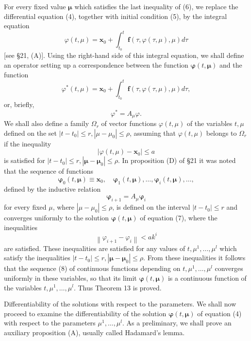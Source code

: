 \documentclass[10pt,a5paper]{book}
\makeatletter
\theoremstyle{plain}
\theoremstyle{definition}
\theoremstyle{remark}
\renewenvironment{proof}[1][\proofname]{\par
  \pushQED{\qed}%
  \normalfont\topsep6\p@\@plus6\p@\relax
  \trivlist
  \item\relax{\itshape #1\@addpunct{.}}\hspace\labelsep\ignorespaces
}{\popQED\endtrivlist\@endpefalse}
\makeatother
\begin{document}
\begin{proof}
For every fixed value $\boldsymbol{\mu}$ which satisfies the last inequality of (6), we replace the differential equation (4), together with initial condition (5), by the integral equation
\begin{equation*}
\varphi(t, \mu)=\mathbf{x}_{0}+\int_{t_{0}}^{t} \mathbf{f}(\tau, \varphi(\tau, \mu), \mu) d \tau \tag{7}
\end{equation*}
[see §21, (A)]. Using the right-hand side of this integral equation, we shall define an operator setting up a correspondence between the function $\boldsymbol{\varphi}(t, \boldsymbol{\mu})$ and the function
\[
\varphi^{*}(t, \mu)=\mathbf{x}_{0}+\int_{t_{0}}^{t} \mathbf{f}(\tau, \varphi(\tau, \mu), \mu) d \tau,
\]
or, briefly,
\[
\varphi^{*}=A_{\mu} \varphi .
\]
We shall also define a family $\Omega_{r}$ of vector functions $\varphi(t, \mu)$ of the variables $t, \mu$ defined on the set $\left|t-t_{0}\right| \leq r,\left|\mu-\mu_{0}\right| \leq \rho$, assuming that $\varphi(t, \mu)$ belongs to $\Omega_{r}$ if the inequality
\[
\left|\varphi(t, \mu)-\mathbf{x}_{0}\right| \leq a
\]
is satisfied for $\left|t-t_{0}\right| \leq r,\left|\boldsymbol{\mu}-\boldsymbol{\mu}_{0}\right| \leq \rho$. In proposition (D) of §21 it was noted that the sequence of functions
\begin{equation*}
\boldsymbol{\varphi}_{0}(t, \boldsymbol{\mu}) \equiv \mathbf{x}_{0}, \quad \boldsymbol{\varphi}_{1}(t, \boldsymbol{\mu}), \ldots, \boldsymbol{\varphi}_{i}(t, \boldsymbol{\mu}), \ldots, \tag{8}
\end{equation*}
defined by the inductive relation
\[
\boldsymbol{\varphi}_{i+1}=A_{\mu} \boldsymbol{\varphi}_{i}
\]
for every fixed $\mu$, where $\left|\mu-\mu_{0}\right| \leq \rho$, is defined on the interval $\left|t-t_{0}\right| \leq r$ and converges uniformly to the solution $\boldsymbol{\varphi}(t, \boldsymbol{\mu})$ of equation (7), where the inequalities
\[
\left\|\varphi_{i+1}-\varphi_{i}\right\|<a k^{i}
\]
are satisfied. These inequalities are satisfied for any values of $t, \mu^{1}, \ldots, \mu^{l}$ which satisfy the inequalities $\left|t-t_{0}\right| \leq r,\left|\boldsymbol{\mu}-\boldsymbol{\mu}_{0}\right| \leq \rho$. From these inequalities it follows that the sequence (8) of continuous functions depending on $t, \mu^{1}, \ldots, \mu^{l}$ converges uniformly in these variables, so that its limit $\boldsymbol{\varphi}(t, \boldsymbol{\mu})$ is a continuous function of the variables $t, \mu^{1}, \ldots, \mu^{l}$. Thus Theorem 13 is proved.

Differentiability of the solutions with respect to the parameters. We shall now proceed to examine the differentiability of the solution $\boldsymbol{\varphi}(t, \boldsymbol{\mu})$ of equation (4) with respect to the parameters $\mu^{1}, \ldots, \mu^{l}$. As a preliminary, we shall prove an auxiliary proposition (A), usually called Hadamard's lemma.


\end{proof}
\end{document}
